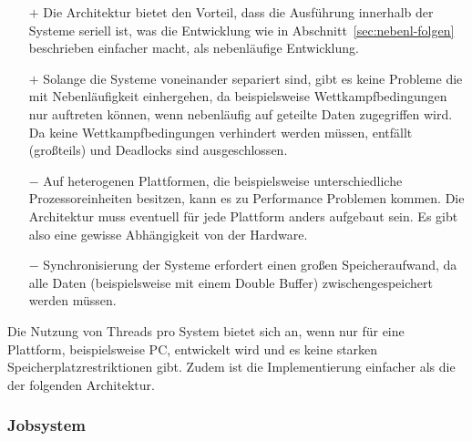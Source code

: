 \begin{itemize}
	\item[$+$] Die Architektur bietet den Vorteil, dass die Ausführung innerhalb der Systeme seriell ist, was die Entwicklung wie in Abschnitt~\ref{sec:nebenl-folgen} beschrieben einfacher macht, als nebenläufige Entwicklung.
	\item[$+$] Solange die Systeme voneinander separiert sind, gibt es keine Probleme die mit Nebenläufigkeit einhergehen, da beispielsweise Wettkampfbedingungen nur auftreten können, wenn nebenläufig auf geteilte Daten zugegriffen wird. Da keine Wettkampfbedingungen verhindert werden müssen, entfällt (großteils) und Deadlocks sind ausgeschlossen.
	\item[$-$] Auf heterogenen Plattformen, die beispielsweise unterschiedliche Prozessoreinheiten besitzen, kann es zu Performance Problemen kommen. Die Architektur muss eventuell für jede Plattform anders aufgebaut sein. Es gibt also eine gewisse Abhängigkeit von der Hardware.
	\item[$-$] Synchronisierung der Systeme erfordert einen großen Speicheraufwand, da alle Daten (beispielsweise mit einem Double Buffer) zwischengespeichert werden müssen.
\end{itemize}

Die Nutzung von Threads pro System bietet sich an, wenn nur für eine Plattform, beispielsweise PC, entwickelt wird und es keine starken Speicherplatzrestriktionen gibt. Zudem ist die Implementierung einfacher als die der folgenden Architektur.

\subsubsection{Jobsystem}\label{sec:gamesJobsystem}

